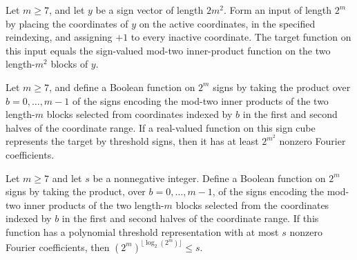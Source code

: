 \begin{theorem}
\label{FABL.ac0ThresholdParityTarget_activeRestriction}
\leanok
{}
Let $m\ge 7$, and let $y$ be a sign vector of length $2m^2$. Form an input of length
$2^m$ by placing the coordinates of $y$ on the active coordinates, in the specified
reindexing, and assigning $+1$ to every inactive coordinate. The target function on this
input equals the sign-valued mod-two inner-product function on the two length-$m^2$
blocks of $y$.
\end{theorem}

\begin{theorem}
\label{FABL.pow_two_sq_le_polynomialSparsity_ac0ThresholdParityTarget}
\leanok
{}
Let $m\ge 7$, and define a Boolean function on $2^m$ signs by taking the product over
$b=0,\ldots,m-1$ of the signs encoding the mod-two inner products of the two length-$m$
blocks selected from coordinates indexed by $b$ in the first and second halves of the
coordinate range. If a real-valued function on this sign cube represents the target by
threshold signs, then it has at least $2^{m^2}$ nonzero Fourier coefficients.
\end{theorem}

\begin{theorem}
\label{FABL.pow_two_pow_log_le_thresholdOfParitiesSize_ac0ThresholdParityTarget}
\leanok
{}
Let $m\ge 7$ and let $s$ be a nonnegative integer. Define a Boolean function on $2^m$
signs by taking the product, over $b=0,\ldots,m-1$, of the signs encoding the mod-two
inner products of the two length-$m$ blocks selected from the coordinates indexed by $b$
in the first and second halves of the coordinate range. If this function has a
polynomial threshold representation with at most $s$ nonzero Fourier coefficients, then
$(2^m)^{\lfloor\log_2(2^m)\rfloor}\le s$.
\end{theorem}
